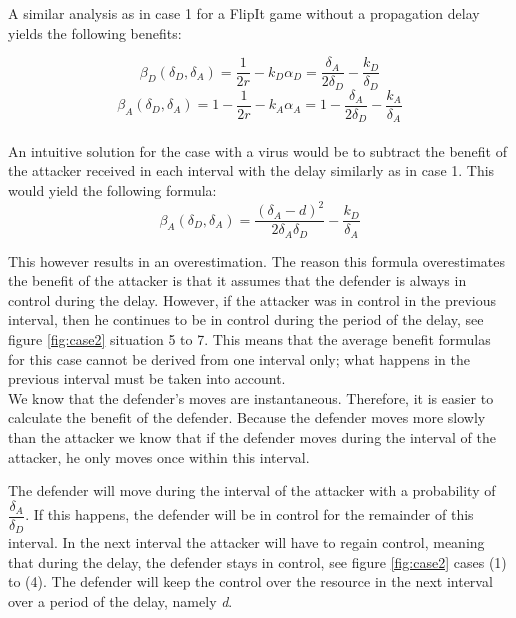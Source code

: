 A similar analysis as in case 1 for a FlipIt game without a propagation delay yields the following benefits:

\begin{equation*}
\beta_{D}(\delta_{D},\delta_{A}) = \dfrac {1} {2r} - k_{D} \alpha_{D} = \dfrac {\delta_{A}} {2\delta_{D}} - \dfrac{k_{D} }{\delta_{D}} 
\end{equation*}
\begin{equation*}
\beta_{A}(\delta_{D},\delta_{A}) =1 - \dfrac {1} {2r} - k_{A} \alpha_{A} = 1- \dfrac {\delta_{A}} {2\delta_{D}} - \dfrac{k_{A}}{ \delta_{A}}  
\end{equation*}\\

An intuitive solution for the case with a virus would be to subtract the benefit of the attacker received in each interval with the delay similarly as in case 1. This would yield the following formula:
\begin{equation*}
\beta_{A}(\delta_{D},\delta_{A})=\dfrac{(\delta_{A} - d)^2}{2\delta_{A}\delta_{D}} - \dfrac{k_{D}}{\delta_{A}}
\end{equation*}

This however results in an overestimation. 
The reason this formula overestimates the benefit of the attacker is that it assumes that the defender is always in control during the delay. However, if the attacker was in control in the previous interval, then he continues to be in control during the period of the delay, see figure \ref{fig:case2} situation 5 to 7. This means that the average benefit formulas for this case cannot be derived from one interval only; what happens in the previous interval must be taken into account. \\

We know that the defender's moves are instantaneous. Therefore, it is easier to calculate the benefit of the defender. Because the defender moves more slowly than the attacker we know that if the defender moves during the interval of the attacker, he only moves once within this interval.

The defender will move during the interval of the attacker with a probability of $\dfrac{\delta_{A}}{\delta_{D}} $. If this happens, the defender will be in control for the remainder of this interval. In the next interval the attacker will have to regain control, meaning that during the delay, the defender stays in control, see figure \ref{fig:case2} cases (1) to (4). The defender will keep the control over the resource in the next interval over a period of the delay, namely \textit{d}. \\

